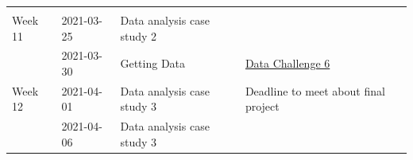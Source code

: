 \documentclass[
]{book}
\begin{document}
\begin{longtable}[]{@{}llll@{}}
\begin{minipage}[t]{0.22\columnwidth}
\strut
\end{minipage}\tabularnewline
\begin{minipage}[t]{0.22\columnwidth}\raggedright
Week 11\strut
\end{minipage} & \begin{minipage}[t]{0.22\columnwidth}\raggedright
2021-03-25\strut
\end{minipage} & \begin{minipage}[t]{0.22\columnwidth}\raggedright
Data analysis case study 2\strut
\end{minipage} & \begin{minipage}[t]{0.22\columnwidth}\raggedright
\strut
\end{minipage}\tabularnewline
\begin{minipage}[t]{0.22\columnwidth}\raggedright
\strut
\end{minipage} & \begin{minipage}[t]{0.22\columnwidth}\raggedright
2021-03-30\strut
\end{minipage} & \begin{minipage}[t]{0.22\columnwidth}\raggedright
Getting Data\strut
\end{minipage} & \begin{minipage}[t]{0.22\columnwidth}\raggedright
\href{}{Data Challenge 6}\strut
\end{minipage}\tabularnewline
\begin{minipage}[t]{0.22\columnwidth}\raggedright
Week 12\strut
\end{minipage} & \begin{minipage}[t]{0.22\columnwidth}\raggedright
2021-04-01\strut
\end{minipage} & \begin{minipage}[t]{0.22\columnwidth}\raggedright
Data analysis case study 3\strut
\end{minipage} & \begin{minipage}[t]{0.22\columnwidth}\raggedright
Deadline to meet about final project\strut
\end{minipage}\tabularnewline
\begin{minipage}[t]{0.22\columnwidth}\raggedright
\strut
\end{minipage} & \begin{minipage}[t]{0.22\columnwidth}\raggedright
2021-04-06\strut
\end{minipage} & \begin{minipage}[t]{0.22\columnwidth}\raggedright
Data analysis case study 3\strut
\end{minipage} & \begin{minipage}[t]{0.22\columnwidth}\raggedright

\end{minipage}
\end{longtable}
\end{document}
